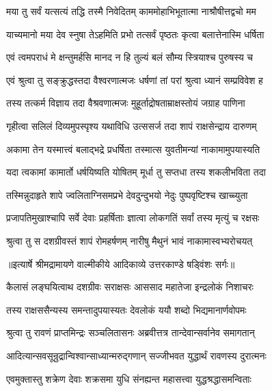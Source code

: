 \twolineshloka
{मया तु सर्वं यत्सत्यं तद्धि तस्मै निवेदितम्}
{काममोहाभिभूतात्मा नाश्रौषीत्तद्वचो मम} %

\twolineshloka
{याच्यमानो मया देव स्नुषा तेऽहमिति प्रभो}
{तत्सर्वं पृष्ठतः कृत्वा बलात्तेनास्मि धर्षिता} %

\twolineshloka
{एवं त्वमपराधं मे क्षन्तुमर्हसि मानद}
{न हि तुल्यं बलं सौम्य स्त्रियाश्च पुरुषस्य च} %

\twolineshloka
{एवं श्रुत्वा तु सङ्क्रुद्धस्तदा वैश्वरणात्मजः}
{धर्षणां तां परां श्रुत्वा ध्यानं सम्प्रविवेश ह} %

\twolineshloka
{तस्य तत्कर्म विज्ञाय तदा वैश्रवणात्मजः}
{मुहूर्ताद्रोषताम्राक्षस्तोयं जग्राह पाणिना} %

\twolineshloka
{गृहीत्वा सलिलं दिव्यमुपस्पृश्य यथाविधि}
{उत्ससर्ज तदा शापं राक्षसेन्द्राय दारुणम्} %

\twolineshloka
{अकामा तेन यस्मात्त्वं बलाद्भद्रे प्रधर्षिता}
{तस्मात्स युवतीमन्यां नाकामामुपयास्यति} %

\twolineshloka
{यदा त्वकामां कामार्तो धर्षयिष्यति योषितम्}
{मूर्धा तु सप्तधा तस्य शकलीभविता तदा} %

\twolineshloka
{तस्मिन्नुदाहृते शापे ज्वलिताग्निसमप्रभे}
{देवदुन्दुभयो नेदुः पुष्पवृष्टिश्च खाच्च्युता} %

\twolineshloka
{प्रजापतिमुखाश्चापि सर्वे देवाः प्रहर्षिताः}
{ज्ञात्वा लोकगतिं सर्वां तस्य मृत्युं च रक्षसः} %

\twolineshloka
{श्रुत्वा तु स दशग्रीवस्तं शापं रोमहर्षणम्}
{नारीषु मैथुनं भावं नाकामास्वभ्यरोचयत्} %


{॥इत्यार्षे श्रीमद्रामायणे वाल्मीकीये आदिकाव्ये उत्तरकाण्डे षड्विंशः सर्गः॥}


\twolineshloka
{कैलासं लङ्घयित्वाथ दशग्रीवः सराक्षसः}
{आससाद महातेजा इन्द्रलोकं निशाचरः} %

\twolineshloka
{तस्य राक्षससैन्यस्य समन्तादुपयास्यतः}
{देवलोकं ययौ शब्दो भिद्यमानार्णवोपमः} %

\twolineshloka
{श्रुत्वा तु रावणं प्राप्तमिन्द्रः सञ्चलितासनः}
{अब्रवीत्तत्र तान्देवान्सर्वानेव समागतान्} %

\twolineshloka
{आदित्यान्सवसून्रुद्रान्विश्वान्साध्यान्मरुद्गणान्}
{सज्जीभवत युद्धार्थं रावणस्य दुरात्मनः} %

\twolineshloka
{एवमुक्तास्तु शक्रेण देवाः शक्रसमा युधि}
{संनह्यन्त महासत्त्वा युद्धश्रद्धासमन्विताः} %


